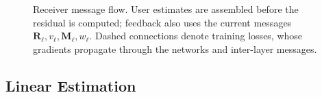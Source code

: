 \begin{figure}[t]
\caption{Receiver message flow. User estimates are assembled before
the residual is computed; feedback also uses the current messages
$\mathbf R_\ell,v_\ell,\mathbf M_\ell,w_\ell$.
Dashed connections denote training losses, whose gradients propagate
through the networks and inter-layer messages.}
\label{fig:twc-receiver}
\end{figure}

\subsection{Linear Estimation}

